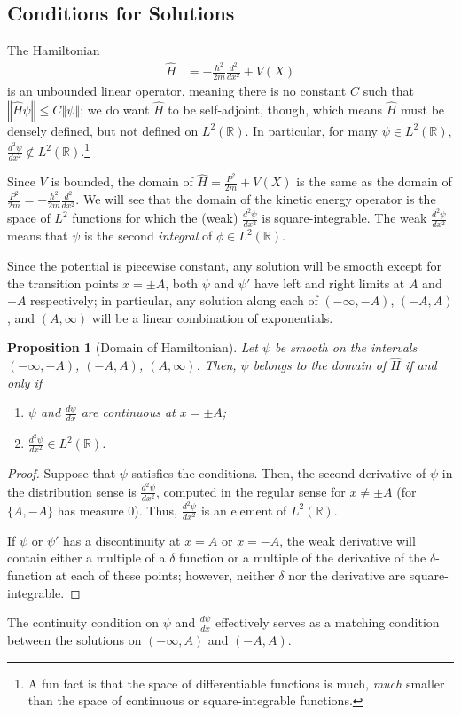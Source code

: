 \documentclass[12pt]{extarticle}
\newcommand{\R}{\mathbb{R}}
\newcommand{\norm}[1]{\left\Vert #1\right\Vert}
\theoremstyle{plain}
\newtheorem*{proposition}{Proposition}%
\theoremstyle{definition}
\theoremstyle{remark}
\renewcommand{\newline}{\hfill\break}
\begin{document}
  \subsection{Conditions for Solutions}%
  The Hamiltonian
  \begin{align*}
    \hat{H} &= -\frac{\hbar^2}{2m} \frac{d ^2}{d x^2} + V(X)
  \end{align*}
  is an unbounded linear operator, meaning there is no constant $C$ such that $\norm{\hat{H}\psi} \leq C\norm{\psi}$; we do want $\hat{H}$ to be self-adjoint, though, which means $\hat{H}$ must be densely defined, but not defined on $L^{2}(\R)$. In particular, for many $\psi \in L^{2}(\R)$, $\frac{d ^2\psi}{d x^2}\notin L^{2}(\R)$.\footnote{A fun fact is that the space of differentiable functions is much, \textit{much} smaller than the space of continuous or square-integrable functions.}\newline

  Since $V$ is bounded, the domain of $\hat{H} = \frac{P^2}{2m} + V(X)$ is the same as the domain of $\frac{P^2}{2m} = -\frac{\hbar^2}{2m}\frac{d ^2}{d x^2}$. We will see that the domain of the kinetic energy operator is the space of $L^{2}$ functions for which the (weak) $\frac{d ^2\psi}{d x^2}$ is square-integrable. The weak $\frac{d ^2\psi}{d x^2}$ means that $\psi$ is the second \textit{integral} of $\phi\in L^{2}(\R)$.\newline

  Since the potential is piecewise constant, any solution will be smooth except for the transition points $x = \pm A$, both $\psi$ and $\psi'$ have left and right limits at $A$ and $-A$ respectively; in particular, any solution along each of $(-\infty,-A)$, $(-A,A)$, and $(A,\infty)$ will be a linear combination of exponentials.
  \begin{proposition}[Domain of Hamiltonian]
    Let $\psi$ be smooth on the intervals $(-\infty,-A)$, $(-A,A)$, $(A,\infty)$. Then, $\psi$ belongs to the domain of $\hat{H}$ if and only if
    \begin{enumerate}[(1)]
      \item $\psi$ and $\frac{d \psi}{d x}$ are continuous at $x = \pm A$;
      \item $\frac{d ^2\psi}{d x^2}\in L^{2}(\R)$.
    \end{enumerate}
  \end{proposition}
  \begin{proof}
    Suppose that $\psi$ satisfies the conditions. Then, the second derivative of $\psi$ in the distribution sense is $\frac{d ^2\psi}{d x^2}$, computed in the regular sense for $x\neq \pm A$ (for $\{A,-A\}$ has measure $0$). Thus, $\frac{d ^2\psi}{d x^2}$ is an element of $L^{2}(\R)$.\newline

    If $\psi$ or $\psi'$ has a discontinuity at $x=A$ or $x=-A$, the weak derivative will contain either a multiple of a $\delta$ function or a multiple of the derivative of the $\delta$-function at each of these points; however, neither $\delta$ nor the derivative are square-integrable.
  \end{proof}
  The continuity condition on $\psi$ and $\frac{d \psi}{d x}$ effectively serves as a matching condition between the solutions on $(-\infty,A)$ and $(-A,A)$.
\end{document}

